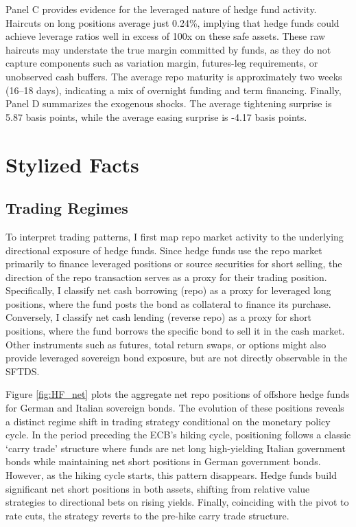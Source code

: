 \documentclass[english, 11pt, oneside]{article}
\begin{document}
Panel C provides evidence for the leveraged nature of hedge fund activity. Haircuts on long positions average just 0.24\%, implying that hedge funds could achieve leverage ratios well in excess of 100x on these safe assets. These raw haircuts may understate the true margin committed by funds, as they do not capture components such as variation margin, futures-leg requirements, or unobserved cash buffers. The average repo maturity is approximately two weeks (16–18 days), indicating a mix of overnight funding and term financing. Finally, Panel D summarizes the exogenous shocks. The average tightening surprise is 5.87 basis points, while the average easing surprise is -4.17 basis points.




\section{Stylized Facts}
\label{sec:stylized_facts}

\subsection{Trading Regimes}
\label{subsec:trading_regimes}

To interpret trading patterns, I first map repo market activity to the underlying directional exposure of hedge funds. Since hedge funds use the repo market primarily to finance leveraged positions or source securities for short selling, the direction of the repo transaction serves as a proxy for their trading position. Specifically, I classify net cash borrowing (repo) as a proxy for leveraged long positions, where the fund posts the bond as collateral to finance its purchase. Conversely, I classify net cash lending (reverse repo) as a proxy for short positions, where the fund borrows the specific bond to sell it in the cash market. Other instruments such as futures, total return swaps, or options might also provide leveraged sovereign bond exposure, but are not directly observable in the SFTDS.

Figure \ref{fig:HF_net} plots the aggregate net repo positions of offshore hedge funds for German and Italian sovereign bonds. The evolution of these positions reveals a distinct regime shift in trading strategy conditional on the monetary policy cycle. In the period preceding the ECB's hiking cycle, positioning follows a classic `carry trade' structure where funds are net long high-yielding Italian government bonds while maintaining net short positions in German government bonds. However, as the hiking cycle starts, this pattern disappears. Hedge funds build significant net short positions in both assets, shifting from relative value strategies to directional bets on rising yields. Finally, coinciding with the pivot to rate cuts, the strategy reverts to the pre-hike carry trade structure. 
\end{document}
